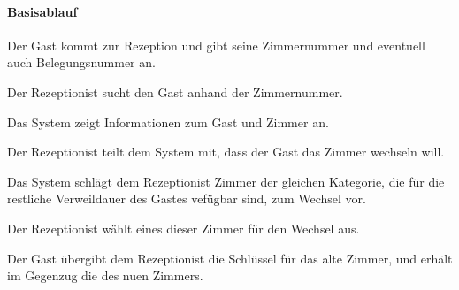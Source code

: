 \paragraph{Basisablauf}
\begin{longenum}
	\item Der \Gls{Gast} kommt zur \Gls{Rezeption} und gibt seine \Gls{Zimmernummer} und eventuell auch \Gls{Belegungsnummer} an.
	\item Der \Gls{Rezeptionist} sucht den Gast anhand der \Gls{Zimmernummer}.
	\item Das System zeigt Informationen zum \Gls{Gast} und \Gls{Zimmer} an.
	\item Der \Gls{Rezeptionist} teilt dem System mit, dass der \Gls{Gast} das \Gls{Zimmer} wechseln will.
	\item Das System schlägt dem \Gls{Rezeptionist} \Gls{Zimmer} der gleichen Kategorie, die für die restliche Verweildauer des \Gls{Gast}es vefügbar sind, zum Wechsel vor.
	\item Der \Gls{Rezeptionist} wählt eines dieser \Gls{Zimmer} für den Wechsel aus.
	\item Der \Gls{Gast} übergibt dem \Gls{Rezeptionist} die Schlüssel für das alte \Gls{Zimmer}, und erhält im Gegenzug die des nuen \Gls{Zimmer}s.
\end{longenum}

